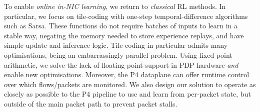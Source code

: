 \documentclass[
sigconf,natbib=false
,anonymous=true
,10pt
]{acmart}
\begin{document}




To enable \emph{online in-NIC learning}, we return to \emph{classical} RL methods.
In particular, we focus on tile-coding with one-step temporal-difference algorithms such as Sarsa.
These functions do not require batches of inputs to learn in a stable way, negating the memory needed to store experience replays, and have simple update and inference logic.
Tile-coding in particular admits many optimisations, being an embarrassingly parallel problem.
Using fixed-point arithmetic, we solve the lack of floating-point support in PDP hardware \emph{and} enable new optimisations.
Moreover, the P4 dataplane can offer runtime control over which flows/packets are monitored.
We also design our solution to operate as closely as possible to the P4 pipeline to use and learn from per-packet state, but outside of the main packet path to prevent packet stalls.

\end{document}
